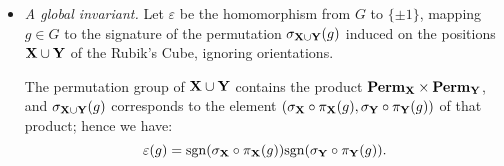 \begin{itemize}
    \item \emph{A global invariant.}
    Let $\varepsilon$ be the homomorphism from $G$ to $\{\pm1\}$, mapping $g \in G$ to the signature of the permutation $\sigma_{\mathbf{X} \cup \mathbf{Y}}(g)$ induced on the positions $\mathbf{X} \cup \mathbf{Y}$ of the Rubik's Cube, ignoring orientations.

    The permutation group of $\mathbf{X} \cup \mathbf{Y}$ contains the product $\mathbf{Perm}_{\mathbf{X}} \times \mathbf{Perm}_{\mathbf{Y}}$, and $\sigma_{\mathbf{X} \cup \mathbf{Y}}(g)$ corresponds to the element
    $(\sigma_{\mathbf{X}} \circ \pi_{\mathbf{X}}(g), \sigma_{\mathbf{Y}} \circ \pi_{\mathbf{Y}}(g))$ of that product; hence we have:
    $$\varepsilon(g) = \mathrm{sgn}(\sigma_{\mathbf{X}} \circ \pi_{\mathbf{X}}(g))  \mathrm{sgn}(\sigma_{\mathbf{Y}} \circ \pi_{\mathbf{Y}}(g)).$$
\end{itemize}
